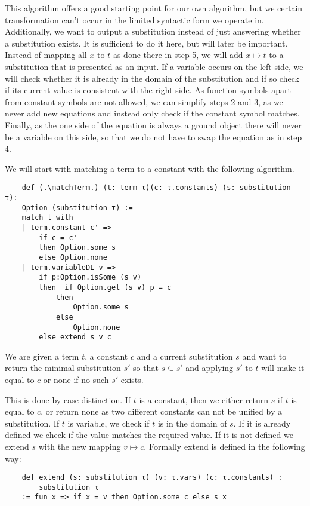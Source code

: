 This algorithm offers a good starting point for our own algorithm, but we certain transformation can't occur in the limited syntactic form we operate in. Additionally, we want to output a substitution instead of just answering whether a substitution exists. It is sufficient to do it here, but will later be important. Instead of mapping all $x$ to $t$ as done there in step 5, we will add $x\mapsto t$ to a substitution that is presented as an input. If a variable occurs on the left side, we will check whether it is already in the domain of the substitution and if so check if its current value is consistent with the right side.
As function symbols apart from constant symbols are not allowed, we can simplify steps 2 and 3, as we never add new equations and instead only check if the constant symbol matches. Finally, as the one side of the equation is always a ground object there will never be a variable on this side, so that we do not have to swap the equation as in step 4.

We will start with matching a term to a constant with the following algorithm.

\begin{lstlisting}
    def (.\matchTerm.) (t: term τ)(c: τ.constants) (s: substitution τ):
    Option (substitution τ) :=
    match t with
    | term.constant c' =>
        if c = c'
        then Option.some s
        else Option.none
    | term.variableDL v =>
        if p:Option.isSome (s v)
        then  if Option.get (s v) p = c
            then
                Option.some s
            else
                Option.none
        else extend s v c
\end{lstlisting}

We are given a term $t$, a constant $c$ and a current substitution $s$ and want to return the minimal substitution $s'$ so that $s \subseteq s'$ and applying $s'$ to $t$ will make it equal to $c$ or none if no such $s'$ exists.

This is done by case distinction. If $t$ is a constant, then we either return $s$ if $t$ is equal to $c$, or return none as two different constants can not be unified by a substitution. If $t$ is variable, we check if $t$ is in the domain of $s$. If it is already defined we check if the value matches the required value. If it is not defined we extend $s$ with the new mapping $v \mapsto c$.
Formally extend is defined in the following way:

\begin{lstlisting}
    def extend (s: substitution τ) (v: τ.vars) (c: τ.constants) :
        substitution τ 
    := fun x => if x = v then Option.some c else s x
\end{lstlisting}

